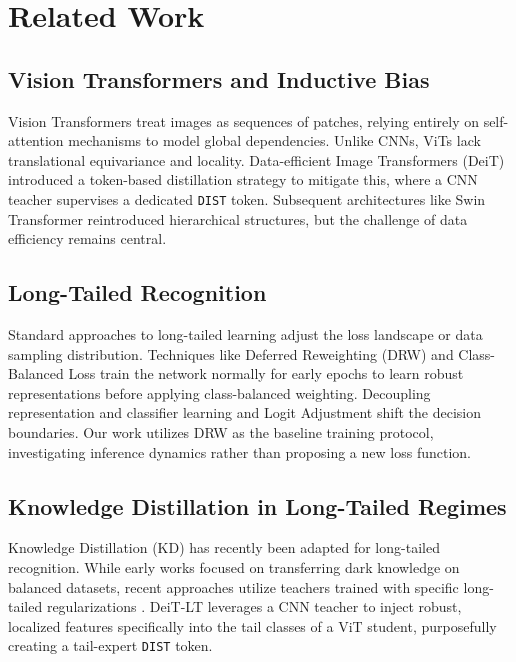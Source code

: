 \documentclass[10pt,twocolumn,letterpaper]{article}
\begin{document}
\section{Related Work}

\subsection{Vision Transformers and Inductive Bias}
Vision Transformers \cite{dosovitskiy2020image} treat images as sequences of patches, relying entirely on self-attention mechanisms \cite{vaswani2017attention} to model global dependencies. Unlike CNNs, ViTs lack translational equivariance and locality. Data-efficient Image Transformers (DeiT) \cite{touvron2021training} introduced a token-based distillation strategy to mitigate this, where a CNN teacher supervises a dedicated \texttt{DIST} token. Subsequent architectures like Swin Transformer \cite{liu2021swin} reintroduced hierarchical structures, but the challenge of data efficiency remains central.

\subsection{Long-Tailed Recognition}
Standard approaches to long-tailed learning adjust the loss landscape or data sampling distribution. Techniques like Deferred Reweighting (DRW) \cite{cao2019learning} and Class-Balanced Loss \cite{cui2019class} train the network normally for early epochs to learn robust representations before applying class-balanced weighting. Decoupling representation and classifier learning \cite{kang2019decoupling} and Logit Adjustment \cite{menon2020long} shift the decision boundaries. Our work utilizes DRW as the baseline training protocol, investigating inference dynamics rather than proposing a new loss function.

\subsection{Knowledge Distillation in Long-Tailed Regimes}
Knowledge Distillation (KD) \cite{hinton2015distilling, gou2021knowledge} has recently been adapted for long-tailed recognition. While early works focused on transferring dark knowledge on balanced datasets, recent approaches utilize teachers trained with specific long-tailed regularizations \cite{zhao2020knowledge}. DeiT-LT \cite{venkateshbabu2024deitlt} leverages a CNN teacher to inject robust, localized features specifically into the tail classes of a ViT student, purposefully creating a tail-expert \texttt{DIST} token.
\end{document}
